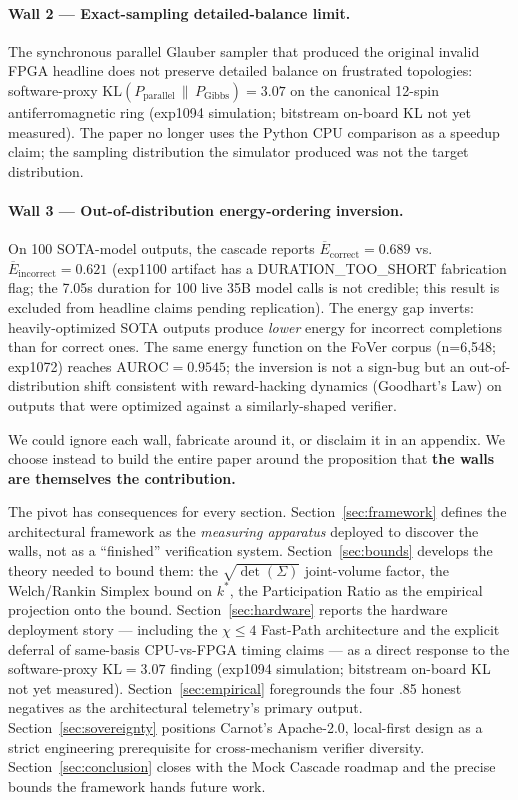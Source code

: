 \documentclass[10pt]{article}
\begin{document}
\paragraph{Wall 2 --- Exact-sampling detailed-balance limit.}
The synchronous parallel Glauber sampler that produced the original
invalid FPGA headline does not preserve
detailed balance on frustrated topologies:
software-proxy
$\mathrm{KL}(P_{\text{parallel}} \,\|\, P_{\text{Gibbs}}) = 3.07$
on the canonical 12-spin antiferromagnetic ring (exp1094 simulation;
bitstream on-board KL not yet measured). The paper no longer uses
the Python CPU comparison as a speedup claim; the sampling
distribution the simulator produced was not the target distribution.

\paragraph{Wall 3 --- Out-of-distribution energy-ordering inversion.}
On 100 SOTA-model outputs, the cascade reports
$\overline{E}_{\mathrm{correct}} = 0.689$ vs.\
$\overline{E}_{\mathrm{incorrect}} = 0.621$ (exp1100 artifact has a DURATION\_TOO\_SHORT fabrication flag; the 7.05s duration for 100 live 35B model calls is not credible; this result is excluded from headline claims pending replication). The energy
gap inverts: heavily-optimized SOTA outputs produce \emph{lower}
energy for incorrect completions than for correct ones. The same
energy function on the FoVer corpus (n=6{,}548; exp1072) reaches
$\mathrm{AUROC} = 0.9545$;
the inversion is not a sign-bug but an out-of-distribution shift
consistent with reward-hacking dynamics (Goodhart's Law) on outputs
that were optimized against a similarly-shaped verifier.

We could ignore each wall, fabricate around it, or disclaim it in
an appendix. We choose instead to build the entire paper around
the proposition that \textbf{the walls are themselves the
contribution.}

The pivot has consequences for every section. Section~\ref{sec:framework}
defines the architectural framework as the \emph{measuring apparatus}
deployed to discover the walls, not as a ``finished'' verification
system. Section~\ref{sec:bounds} develops the theory needed to
bound them: the $\sqrt{\det(\Sigma)}$ joint-volume factor, the
Welch/Rankin Simplex bound on $k^*$, the Participation Ratio as the
empirical projection onto the bound. Section~\ref{sec:hardware}
reports the hardware deployment story --- including the
$\chi \leq 4$ Fast-Path architecture and the explicit deferral of
same-basis CPU-vs-FPGA timing claims --- as a
direct response to the software-proxy $\mathrm{KL} = 3.07$ finding
(exp1094 simulation; bitstream on-board KL not yet measured).
Section~\ref{sec:empirical} foregrounds the four .85 honest
negatives as the architectural telemetry's primary output.
Section~\ref{sec:sovereignty} positions Carnot's Apache-2.0,
local-first design as a strict engineering prerequisite for
cross-mechanism verifier diversity. Section~\ref{sec:conclusion}
closes with the Mock Cascade roadmap and the precise bounds the
framework hands future work.
\end{document}
